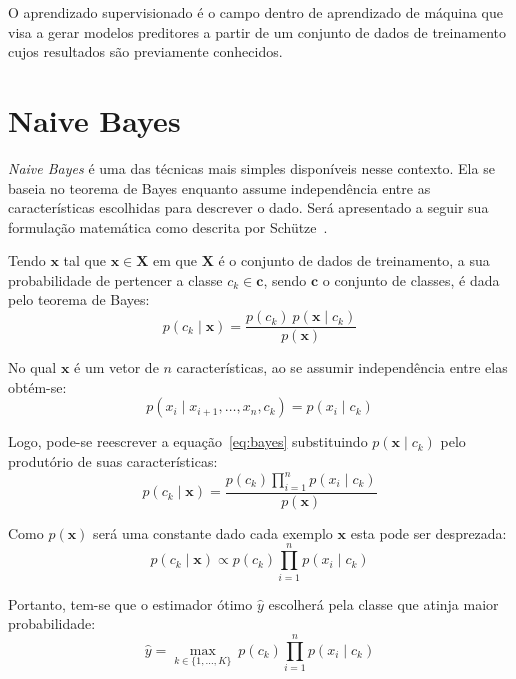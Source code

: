 O aprendizado supervisionado é o campo dentro de aprendizado de máquina que visa a gerar modelos preditores a partir de um conjunto de dados de treinamento cujos resultados são previamente conhecidos.

\section{Naive Bayes}

\textit{Naive Bayes} é uma das técnicas mais simples disponíveis nesse contexto. Ela se baseia no teorema de Bayes enquanto assume independência entre as características escolhidas para descrever o dado. Será apresentado a seguir sua formulação matemática como descrita por Schütze~\cite{schutze08}.

Tendo $\mathbf{x}$ tal que $\mathbf{x} \in \mathbf{X}$ em que $\mathbf{X}$ é o conjunto de dados de treinamento, a sua probabilidade de pertencer a classe $c_k \in \mathbf{c}$, sendo $\mathbf{c}$ o conjunto de classes, é dada pelo teorema de Bayes:
\begin{equation} \label{eq:bayes}
    p(c_k \mid \mathbf{x}) = \frac{p(c_k) \ p(\mathbf{x} \mid c_k)}{p(\mathbf{x})}
\end{equation}

No qual $\mathbf{x}$ é um vetor de $n$ características, ao se assumir independência entre elas obtém-se:
\begin{equation}
    p(x_i \mid x_{i+1}, \dots ,x_{n}, c_k ) = p(x_i \mid c_k)
\end{equation}

Logo, pode-se reescrever a equação~\ref{eq:bayes} substituindo $p(\mathbf{x} \mid c_k)$ pelo produtório de suas características:
\begin{equation}
    p(c_k \mid \mathbf{x}) = \frac{p(c_k) \prod_{i=1}^n p(x_i \mid c_k)}{p(\mathbf{x})}
\end{equation}

Como $p(\mathbf{x})$ será uma constante dado cada exemplo $\mathbf{x}$ esta pode ser desprezada:
\begin{equation}
    p(c_k \mid \mathbf{x}) \propto p(c_k) \prod_{i=1}^n p(x_i \mid c_k)
\end{equation}

Portanto, tem-se que o estimador ótimo $\hat{y}$ escolherá pela classe que atinja maior probabilidade:
\begin{equation}
    \hat{y} = \underset{k \in \{1, \dots, K\}}{\operatorname{max}} \ p(c_k) \displaystyle\prod_{i=1}^n p(x_i \mid c_k)
\end{equation}

